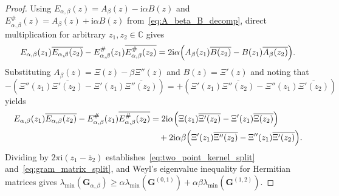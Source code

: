 \documentclass[11pt,reqno]{amsart}
\theoremstyle{definition}
\theoremstyle{remark}
\numberwithin{equation}{section}
\newcommand{\C}{\mathbb{C}}
\newcommand{\ii}{\mathrm{i}}
\begin{document}
\begin{proof}
Using $E_{\alpha,\beta}(z) = A_\beta(z) - \ii\alpha B(z)$ and $E_{\alpha,\beta}^\#(z) = A_\beta(z) + \ii\alpha B(z)$ from~\eqref{eq:A_beta_B_decomp}, direct multiplication for arbitrary $z_1, z_2 \in \C$ gives
\[
E_{\alpha,\beta}(z_1)\overline{E_{\alpha,\beta}(z_2)} - E_{\alpha,\beta}^\#(z_1)\overline{E_{\alpha,\beta}^\#(z_2)} = 2\ii\alpha\Bigl(A_\beta(z_1)\overline{B(z_2)} - B(z_1)\overline{A_\beta(z_2)}\Bigr).
\]
Substituting $A_\beta(z) = \Xi(z) - \beta\Xi''(z)$ and $B(z) = \Xi'(z)$ and noting that $-(\Xi''(z_1)\overline{\Xi'(z_2)} - \Xi'(z_1)\overline{\Xi''(z_2)}) = +(\Xi'(z_1)\overline{\Xi''(z_2)} - \Xi''(z_1)\overline{\Xi'(z_2)})$ yields
\begin{align*}
E_{\alpha,\beta}(z_1)\overline{E_{\alpha,\beta}(z_2)} - E_{\alpha,\beta}^\#(z_1)\overline{E_{\alpha,\beta}^\#(z_2)} &= 2\ii\alpha\Bigl(\Xi(z_1)\overline{\Xi'(z_2)} - \Xi'(z_1)\overline{\Xi(z_2)}\Bigr) \\
&\quad + 2\ii\alpha\beta\Bigl(\Xi'(z_1)\overline{\Xi''(z_2)} - \Xi''(z_1)\overline{\Xi'(z_2)}\Bigr).
\end{align*}
Dividing by $2\pi\ii(z_1 - \bar{z}_2)$ establishes~\eqref{eq:two_point_kernel_split} and~\eqref{eq:gram_matrix_split}, and Weyl's eigenvalue inequality for Hermitian matrices gives $\lambda_{\min}(\mathbf{G}_{\alpha,\beta}) \ge \alpha\lambda_{\min}(\mathbf{G}^{(0,1)}) + \alpha\beta\lambda_{\min}(\mathbf{G}^{(1,2)})$.
\end{proof}
\end{document}
